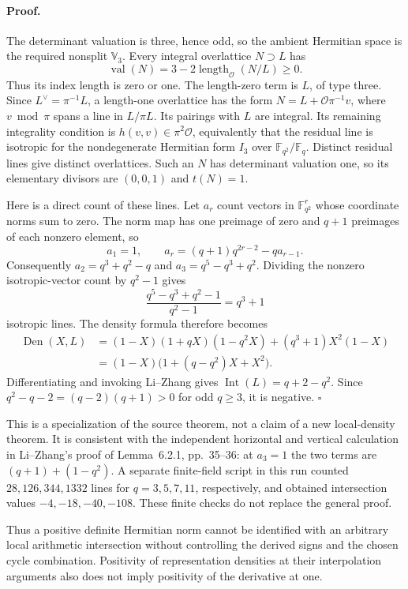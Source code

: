 \paragraph{Proof.}
The determinant valuation is three, hence odd, so the ambient
Hermitian space is the required nonsplit $\mathbb V_3$. Every
integral overlattice $N\supset L$ has
\[
 \operatorname{val}(N)=3-2\operatorname{length}_{\mathcal O}(N/L)
 \geq0.
\]
Thus its index length is zero or one. The length-zero term is $L$,
of type three. Since $L^\vee=\pi^{-1}L$, a length-one overlattice
has the form $N=L+\mathcal O\pi^{-1}v$, where $v\bmod\pi$ spans
a line in $L/\pi L$. Its pairings with $L$ are integral. Its
remaining integrality condition is
$h(v,v)\in\pi^2\mathcal O$, equivalently that the residual line
is isotropic for the nondegenerate Hermitian form $I_3$ over
$\mathbb F_{q^2}/\mathbb F_q$. Distinct residual lines give
distinct overlattices. Such an $N$ has determinant valuation one,
so its elementary divisors are $(0,0,1)$ and $t(N)=1$.

Here is a direct count of these lines. Let $a_r$ count vectors in
$\mathbb F_{q^2}^r$ whose coordinate norms sum to zero. The norm
map has one preimage of zero and $q+1$ preimages of each nonzero
element, so
\[
 a_1=1,\qquad
 a_r=(q+1)q^{2r-2}-q a_{r-1}.
\]
Consequently $a_2=q^3+q^2-q$ and $a_3=q^5-q^3+q^2$. Dividing the
nonzero isotropic-vector count by $q^2-1$ gives
\[
 \frac{q^5-q^3+q^2-1}{q^2-1}=q^3+1
\]
isotropic lines. The density formula therefore becomes
\begin{align*}
 \operatorname{Den}(X,L)
 &=(1-X)(1+qX)(1-q^2X)+(q^3+1)X^2(1-X)\\
 &=(1-X)\bigl(1+(q-q^2)X+X^2\bigr).
\end{align*}
Differentiating and invoking Li--Zhang gives
$\operatorname{Int}(L)=q+2-q^2$. Since
$q^2-q-2=(q-2)(q+1)>0$ for odd $q\geq3$, it is negative.
$\square$

This is a specialization of the source theorem, not a claim of a
new local-density theorem. It is consistent with the independent
horizontal and vertical calculation in Li--Zhang's proof of
Lemma~6.2.1, pp.~35--36: at $a_3=1$ the two terms are
$(q+1)+(1-q^2)$. A separate finite-field script in this run counted
$28,126,344,1332$ lines for $q=3,5,7,11$, respectively, and obtained
intersection values $-4,-18,-40,-108$. These finite checks do not
replace the general proof.

Thus a positive definite Hermitian norm cannot be identified with
an arbitrary local arithmetic intersection without controlling the
derived signs and the chosen cycle combination. Positivity of
representation densities at their interpolation arguments also
does not imply positivity of the derivative at one.

